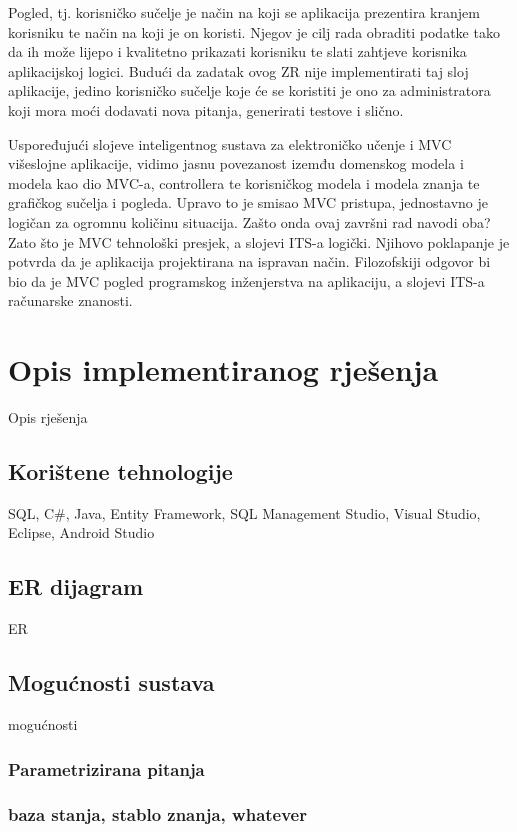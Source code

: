 \documentclass[times, utf8, zavrsni]{fer}
\begin{document}
\par
Pogled, tj. korisničko sučelje je način na koji se aplikacija prezentira kranjem korisniku te način na koji je on koristi. Njegov je cilj rada obraditi podatke tako da ih može lijepo i kvalitetno prikazati korisniku te slati zahtjeve korisnika aplikacijskoj logici. Budući da zadatak ovog ZR nije implementirati taj sloj aplikacije, jedino korisničko sučelje koje će se koristiti je ono za administratora koji mora moći dodavati nova pitanja, generirati testove i slično.
\par
Uspoređujući slojeve inteligentnog sustava za elektroničko učenje i MVC višeslojne aplikacije, vidimo jasnu povezanost izemđu domenskog modela i modela kao dio MVC-a, controllera te korisničkog modela i modela znanja te grafičkog sučelja i pogleda. Upravo to je smisao MVC pristupa, jednostavno je logičan za ogromnu količinu situacija. Zašto onda ovaj završni rad navodi oba? Zato što je MVC tehnološki presjek, a slojevi ITS-a logički. Njihovo poklapanje je potvrda da je aplikacija projektirana na ispravan način. Filozofskiji odgovor bi bio da je MVC pogled programskog inženjerstva na aplikaciju, a slojevi ITS-a računarske znanosti.

\chapter{Opis implementiranog rješenja}
Opis rješenja

\section{Korištene tehnologije}
SQL, C\#, Java, Entity Framework,
SQL Management Studio, Visual Studio, Eclipse, Android Studio

\section{ER dijagram}
ER

\section{Mogućnosti sustava}
mogućnosti

\subsection{Parametrizirana pitanja}

\subsection{baza stanja, stablo znanja, whatever}
\end{document}
